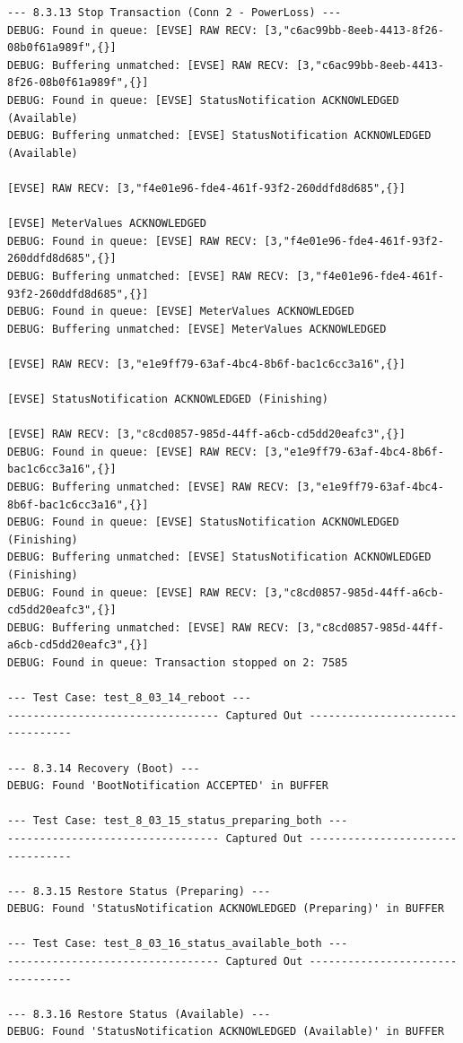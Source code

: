 \documentclass{article}
\begin{document}
\begin{lstlisting}
--- 8.3.13 Stop Transaction (Conn 2 - PowerLoss) ---
DEBUG: Found in queue: [EVSE] RAW RECV: [3,"c6ac99bb-8eeb-4413-8f26-08b0f61a989f",{}]
DEBUG: Buffering unmatched: [EVSE] RAW RECV: [3,"c6ac99bb-8eeb-4413-8f26-08b0f61a989f",{}]
DEBUG: Found in queue: [EVSE] StatusNotification ACKNOWLEDGED (Available)
DEBUG: Buffering unmatched: [EVSE] StatusNotification ACKNOWLEDGED (Available)

[EVSE] RAW RECV: [3,"f4e01e96-fde4-461f-93f2-260ddfd8d685",{}]

[EVSE] MeterValues ACKNOWLEDGED
DEBUG: Found in queue: [EVSE] RAW RECV: [3,"f4e01e96-fde4-461f-93f2-260ddfd8d685",{}]
DEBUG: Buffering unmatched: [EVSE] RAW RECV: [3,"f4e01e96-fde4-461f-93f2-260ddfd8d685",{}]
DEBUG: Found in queue: [EVSE] MeterValues ACKNOWLEDGED
DEBUG: Buffering unmatched: [EVSE] MeterValues ACKNOWLEDGED

[EVSE] RAW RECV: [3,"e1e9ff79-63af-4bc4-8b6f-bac1c6cc3a16",{}]

[EVSE] StatusNotification ACKNOWLEDGED (Finishing)

[EVSE] RAW RECV: [3,"c8cd0857-985d-44ff-a6cb-cd5dd20eafc3",{}]
DEBUG: Found in queue: [EVSE] RAW RECV: [3,"e1e9ff79-63af-4bc4-8b6f-bac1c6cc3a16",{}]
DEBUG: Buffering unmatched: [EVSE] RAW RECV: [3,"e1e9ff79-63af-4bc4-8b6f-bac1c6cc3a16",{}]
DEBUG: Found in queue: [EVSE] StatusNotification ACKNOWLEDGED (Finishing)
DEBUG: Buffering unmatched: [EVSE] StatusNotification ACKNOWLEDGED (Finishing)
DEBUG: Found in queue: [EVSE] RAW RECV: [3,"c8cd0857-985d-44ff-a6cb-cd5dd20eafc3",{}]
DEBUG: Buffering unmatched: [EVSE] RAW RECV: [3,"c8cd0857-985d-44ff-a6cb-cd5dd20eafc3",{}]
DEBUG: Found in queue: Transaction stopped on 2: 7585

--- Test Case: test_8_03_14_reboot ---
--------------------------------- Captured Out ---------------------------------

--- 8.3.14 Recovery (Boot) ---
DEBUG: Found 'BootNotification ACCEPTED' in BUFFER

--- Test Case: test_8_03_15_status_preparing_both ---
--------------------------------- Captured Out ---------------------------------

--- 8.3.15 Restore Status (Preparing) ---
DEBUG: Found 'StatusNotification ACKNOWLEDGED (Preparing)' in BUFFER

--- Test Case: test_8_03_16_status_available_both ---
--------------------------------- Captured Out ---------------------------------

--- 8.3.16 Restore Status (Available) ---
DEBUG: Found 'StatusNotification ACKNOWLEDGED (Available)' in BUFFER

\end{lstlisting}
\end{document}
